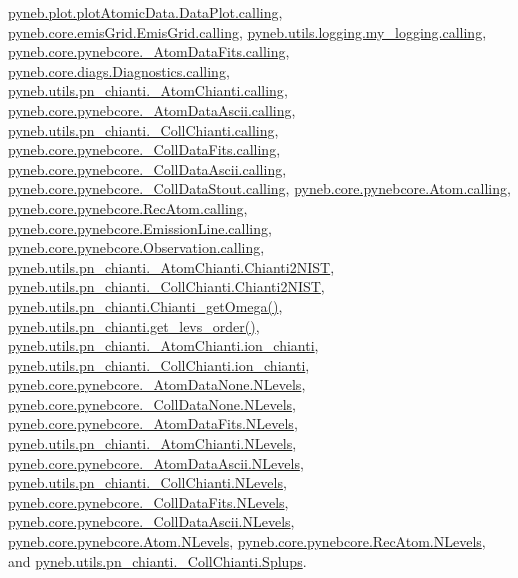 \hyperlink{plot_atomic_data_8py_source_l00042}{pyneb.\-plot.\-plot\-Atomic\-Data.\-Data\-Plot.\-calling}, \hyperlink{emis_grid_8py_source_l00044}{pyneb.\-core.\-emis\-Grid.\-Emis\-Grid.\-calling}, \hyperlink{logging_8py_source_l00044}{pyneb.\-utils.\-logging.\-my\-\_\-logging.\-calling}, \hyperlink{pynebcore_8py_source_l00097}{pyneb.\-core.\-pynebcore.\-\_\-\-Atom\-Data\-Fits.\-calling}, \hyperlink{diags_8py_source_l00169}{pyneb.\-core.\-diags.\-Diagnostics.\-calling}, \hyperlink{pn__chianti_8py_source_l00240}{pyneb.\-utils.\-pn\-\_\-chianti.\-\_\-\-Atom\-Chianti.\-calling}, \hyperlink{pynebcore_8py_source_l00318}{pyneb.\-core.\-pynebcore.\-\_\-\-Atom\-Data\-Ascii.\-calling}, \hyperlink{pn__chianti_8py_source_l00434}{pyneb.\-utils.\-pn\-\_\-chianti.\-\_\-\-Coll\-Chianti.\-calling}, \hyperlink{pynebcore_8py_source_l00585}{pyneb.\-core.\-pynebcore.\-\_\-\-Coll\-Data\-Fits.\-calling}, \hyperlink{pynebcore_8py_source_l00936}{pyneb.\-core.\-pynebcore.\-\_\-\-Coll\-Data\-Ascii.\-calling}, \hyperlink{pynebcore_8py_source_l01156}{pyneb.\-core.\-pynebcore.\-\_\-\-Coll\-Data\-Stout.\-calling}, \hyperlink{pynebcore_8py_source_l01229}{pyneb.\-core.\-pynebcore.\-Atom.\-calling}, \hyperlink{pynebcore_8py_source_l02643}{pyneb.\-core.\-pynebcore.\-Rec\-Atom.\-calling}, \hyperlink{pynebcore_8py_source_l03385}{pyneb.\-core.\-pynebcore.\-Emission\-Line.\-calling}, \hyperlink{pynebcore_8py_source_l03541}{pyneb.\-core.\-pynebcore.\-Observation.\-calling}, \hyperlink{pn__chianti_8py_source_l00241}{pyneb.\-utils.\-pn\-\_\-chianti.\-\_\-\-Atom\-Chianti.\-Chianti2\-N\-I\-S\-T}, \hyperlink{pn__chianti_8py_source_l00460}{pyneb.\-utils.\-pn\-\_\-chianti.\-\_\-\-Coll\-Chianti.\-Chianti2\-N\-I\-S\-T}, \hyperlink{pn__chianti_8py_source_l00119}{pyneb.\-utils.\-pn\-\_\-chianti.\-Chianti\-\_\-get\-Omega()}, \hyperlink{pn__chianti_8py_source_l00051}{pyneb.\-utils.\-pn\-\_\-chianti.\-get\-\_\-levs\-\_\-order()}, \hyperlink{pn__chianti_8py_source_l00239}{pyneb.\-utils.\-pn\-\_\-chianti.\-\_\-\-Atom\-Chianti.\-ion\-\_\-chianti}, \hyperlink{pn__chianti_8py_source_l00433}{pyneb.\-utils.\-pn\-\_\-chianti.\-\_\-\-Coll\-Chianti.\-ion\-\_\-chianti}, \hyperlink{pynebcore_8py_source_l00069}{pyneb.\-core.\-pynebcore.\-\_\-\-Atom\-Data\-None.\-N\-Levels}, \hyperlink{pynebcore_8py_source_l00082}{pyneb.\-core.\-pynebcore.\-\_\-\-Coll\-Data\-None.\-N\-Levels}, \hyperlink{pynebcore_8py_source_l00098}{pyneb.\-core.\-pynebcore.\-\_\-\-Atom\-Data\-Fits.\-N\-Levels}, \hyperlink{pn__chianti_8py_source_l00242}{pyneb.\-utils.\-pn\-\_\-chianti.\-\_\-\-Atom\-Chianti.\-N\-Levels}, \hyperlink{pynebcore_8py_source_l00319}{pyneb.\-core.\-pynebcore.\-\_\-\-Atom\-Data\-Ascii.\-N\-Levels}, \hyperlink{pn__chianti_8py_source_l00435}{pyneb.\-utils.\-pn\-\_\-chianti.\-\_\-\-Coll\-Chianti.\-N\-Levels}, \hyperlink{pynebcore_8py_source_l00586}{pyneb.\-core.\-pynebcore.\-\_\-\-Coll\-Data\-Fits.\-N\-Levels}, \hyperlink{pynebcore_8py_source_l00933}{pyneb.\-core.\-pynebcore.\-\_\-\-Coll\-Data\-Ascii.\-N\-Levels}, \hyperlink{pynebcore_8py_source_l01231}{pyneb.\-core.\-pynebcore.\-Atom.\-N\-Levels}, \hyperlink{pynebcore_8py_source_l02661}{pyneb.\-core.\-pynebcore.\-Rec\-Atom.\-N\-Levels}, and \hyperlink{pn__chianti_8py_source_l00454}{pyneb.\-utils.\-pn\-\_\-chianti.\-\_\-\-Coll\-Chianti.\-Splups}.


